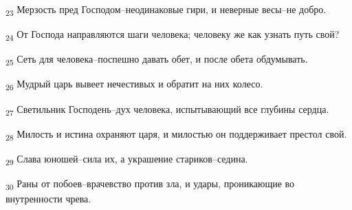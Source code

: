 \begin{tcolorbox}
\textsubscript{23} Мерзость пред Господом--неодинаковые гири, и неверные весы--не добро.
\end{tcolorbox}
\begin{tcolorbox}
\textsubscript{24} От Господа направляются шаги человека; человеку же как узнать путь свой?
\end{tcolorbox}
\begin{tcolorbox}
\textsubscript{25} Сеть для человека--поспешно давать обет, и после обета обдумывать.
\end{tcolorbox}
\begin{tcolorbox}
\textsubscript{26} Мудрый царь вывеет нечестивых и обратит на них колесо.
\end{tcolorbox}
\begin{tcolorbox}
\textsubscript{27} Светильник Господень--дух человека, испытывающий все глубины сердца.
\end{tcolorbox}
\begin{tcolorbox}
\textsubscript{28} Милость и истина охраняют царя, и милостью он поддерживает престол свой.
\end{tcolorbox}
\begin{tcolorbox}
\textsubscript{29} Слава юношей--сила их, а украшение стариков--седина.
\end{tcolorbox}
\begin{tcolorbox}
\textsubscript{30} Раны от побоев--врачевство против зла, и удары, проникающие во внутренности чрева.
\end{tcolorbox}
